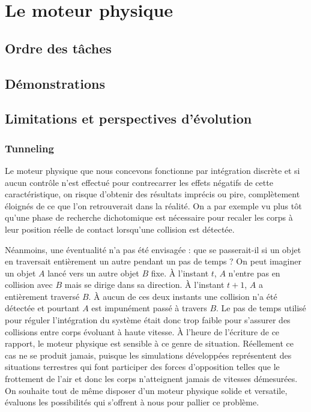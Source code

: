 \section{Le moteur physique}

\subsection{Ordre des tâches}

\subsection{Démonstrations}

\subsection{Limitations et perspectives d'évolution}

\subsubsection{Tunneling}

Le moteur physique que nous concevons fonctionne par intégration
discrète et si aucun contrôle n'est effectué pour contrecarrer les
effets négatifs de cette caractéristique, on risque d'obtenir des
résultats imprécis ou pire, complètement éloignés de ce que l'on
retrouverait dans la réalité. On a par exemple vu plus tôt qu'une
phase de recherche dichotomique est nécessaire pour recaler les corps
à leur position réelle de contact lorsqu'une collision est détectée.

Néanmoins, une éventualité n'a pas été envisagée : que se passerait-il
si un objet en traversait entièrement un autre pendant un pas de temps
? On peut imaginer un objet $A$ lancé vers un autre objet $B$
fixe. \`A l'instant $t$, $A$ n'entre pas en collision avec $B$ mais se
dirige dans sa direction. \`A l'instant $t+1$, $A$ a entièrement
traversé $B$. \`A aucun de ces deux instants une collision n'a été
détectée et pourtant $A$ est impunément passé à travers $B$. Le pas de
temps utilisé pour réguler l'intégration du système était donc trop
faible pour s'assurer des collisions entre corps évoluant à haute
vitesse. \`A l'heure de l'écriture de ce rapport, le moteur physique
est sensible à ce genre de situation. Réellement ce cas ne se produit
jamais, puisque les simulations développées représentent des
situations terrestres qui font participer des forces d'opposition
telles que le frottement de l'air et donc les corps n'atteignent
jamais de vitesses démesurées. On souhaite tout de même disposer d'un
moteur physique solide et versatile, évaluons les possibilités qui
s'offrent à nous pour pallier ce problème.

